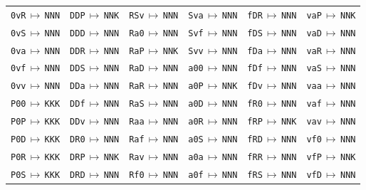 {\begin{longtable}{@{}llllll@{}}
\texttt{0vR}\,$\mapsto$\,\texttt{NNN} & \texttt{DDP}\,$\mapsto$\,\texttt{NNK} & \texttt{RSv}\,$\mapsto$\,\texttt{NNN} & \texttt{Sva}\,$\mapsto$\,\texttt{NNN} & \texttt{fDR}\,$\mapsto$\,\texttt{NNN} & \texttt{vaP}\,$\mapsto$\,\texttt{NNK} \\
\texttt{0vS}\,$\mapsto$\,\texttt{NNN} & \texttt{DDD}\,$\mapsto$\,\texttt{NNN} & \texttt{Ra0}\,$\mapsto$\,\texttt{NNN} & \texttt{Svf}\,$\mapsto$\,\texttt{NNN} & \texttt{fDS}\,$\mapsto$\,\texttt{NNN} & \texttt{vaD}\,$\mapsto$\,\texttt{NNN} \\
\texttt{0va}\,$\mapsto$\,\texttt{NNN} & \texttt{DDR}\,$\mapsto$\,\texttt{NNN} & \texttt{RaP}\,$\mapsto$\,\texttt{NNK} & \texttt{Svv}\,$\mapsto$\,\texttt{NNN} & \texttt{fDa}\,$\mapsto$\,\texttt{NNN} & \texttt{vaR}\,$\mapsto$\,\texttt{NNN} \\
\texttt{0vf}\,$\mapsto$\,\texttt{NNN} & \texttt{DDS}\,$\mapsto$\,\texttt{NNN} & \texttt{RaD}\,$\mapsto$\,\texttt{NNN} & \texttt{a00}\,$\mapsto$\,\texttt{NNN} & \texttt{fDf}\,$\mapsto$\,\texttt{NNN} & \texttt{vaS}\,$\mapsto$\,\texttt{NNN} \\
\texttt{0vv}\,$\mapsto$\,\texttt{NNN} & \texttt{DDa}\,$\mapsto$\,\texttt{NNN} & \texttt{RaR}\,$\mapsto$\,\texttt{NNN} & \texttt{a0P}\,$\mapsto$\,\texttt{NNK} & \texttt{fDv}\,$\mapsto$\,\texttt{NNN} & \texttt{vaa}\,$\mapsto$\,\texttt{NNN} \\
\texttt{P00}\,$\mapsto$\,\texttt{KKK} & \texttt{DDf}\,$\mapsto$\,\texttt{NNN} & \texttt{RaS}\,$\mapsto$\,\texttt{NNN} & \texttt{a0D}\,$\mapsto$\,\texttt{NNN} & \texttt{fR0}\,$\mapsto$\,\texttt{NNN} & \texttt{vaf}\,$\mapsto$\,\texttt{NNN} \\
\texttt{P0P}\,$\mapsto$\,\texttt{KKK} & \texttt{DDv}\,$\mapsto$\,\texttt{NNN} & \texttt{Raa}\,$\mapsto$\,\texttt{NNN} & \texttt{a0R}\,$\mapsto$\,\texttt{NNN} & \texttt{fRP}\,$\mapsto$\,\texttt{NNK} & \texttt{vav}\,$\mapsto$\,\texttt{NNN} \\
\texttt{P0D}\,$\mapsto$\,\texttt{KKK} & \texttt{DR0}\,$\mapsto$\,\texttt{NNN} & \texttt{Raf}\,$\mapsto$\,\texttt{NNN} & \texttt{a0S}\,$\mapsto$\,\texttt{NNN} & \texttt{fRD}\,$\mapsto$\,\texttt{NNN} & \texttt{vf0}\,$\mapsto$\,\texttt{NNN} \\
\texttt{P0R}\,$\mapsto$\,\texttt{KKK} & \texttt{DRP}\,$\mapsto$\,\texttt{NNK} & \texttt{Rav}\,$\mapsto$\,\texttt{NNN} & \texttt{a0a}\,$\mapsto$\,\texttt{NNN} & \texttt{fRR}\,$\mapsto$\,\texttt{NNN} & \texttt{vfP}\,$\mapsto$\,\texttt{NNK} \\
\texttt{P0S}\,$\mapsto$\,\texttt{KKK} & \texttt{DRD}\,$\mapsto$\,\texttt{NNN} & \texttt{Rf0}\,$\mapsto$\,\texttt{NNN} & \texttt{a0f}\,$\mapsto$\,\texttt{NNN} & \texttt{fRS}\,$\mapsto$\,\texttt{NNN} & \texttt{vfD}\,$\mapsto$\,\texttt{NNN} \\

\end{longtable}}
